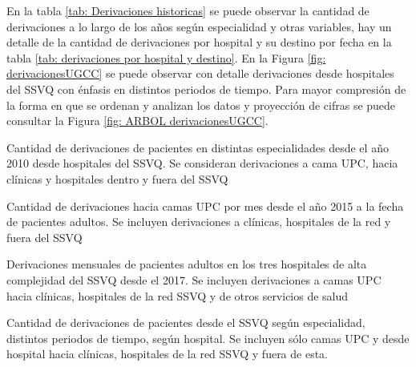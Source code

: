 \documentclass{article}
\begin{document}
En la tabla \ref{tab: Derivaciones historicas} se puede observar la cantidad de derivaciones a lo largo de los años según especialidad y otras variables, hay un detalle de la cantidad de derivaciones por hospital y su destino por fecha en la tabla \ref{tab: derivaciones por hospital y destino}. En la Figura \ref{fig: derivacionesUGCC} se puede observar con detalle derivaciones desde hospitales del SSVQ con énfasis en distintos periodos de tiempo. Para mayor compresión de la forma en que se ordenan y analizan los datos y proyección de cifras se puede consultar la Figura \ref{fig: ARBOL derivacionesUGCC}.

\begin{table}[h]
	\begin{subtable}{0.5\textwidth}
		\centering
		\begin{adjustbox}{width=0.95\textwidth}
		\end{adjustbox}
		\caption{Cantidad de derivaciones de pacientes en distintas especialidades desde el año 2010 desde hospitales del SSVQ. Se consideran derivaciones a cama UPC, hacia clínicas y hospitales dentro y fuera del SSVQ}

\vspace{0.7cm}

		\begin{adjustbox}{width=0.7\textwidth}
		\end{adjustbox}
	\caption{Cantidad de derivaciones hacia camas UPC por mes desde el año 2015 a la fecha de pacientes adultos. Se incluyen derivaciones a clínicas, hospitales de la red y fuera del SSVQ}
	\end{subtable}%
	\begin{subtable}{0.5\textwidth}
	\centering
	\begin{adjustbox}{width=0.95\textwidth}
	\end{adjustbox}
	\caption{Derivaciones mensuales de pacientes adultos en los tres hospitales de alta complejidad del SSVQ desde el 2017. Se incluyen derivaciones a camas UPC hacia clínicas, hospitales de la red SSVQ y de otros servicios de salud}
\end{subtable}
\caption{Cantidad de derivaciones de pacientes desde el SSVQ según especialidad, distintos periodos de tiempo, según hospital. Se incluyen sólo camas UPC y desde hospital hacia clínicas, hospitales de la red SSVQ y fuera de esta. }
\label{tab: Derivaciones historicas}
\end{table}
\end{document}
